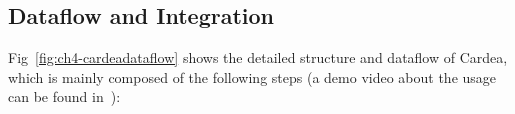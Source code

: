 \subsection{Dataflow and Integration}
Fig~\ref{fig:ch4-cardeadataflow} shows the detailed structure and dataflow of Cardea, which is mainly composed of the following steps (a demo video about the usage can be found in~\cite{links:cardeavid}):

\begin{description}[leftmargin=0cm]

\begin{figure}[!htbp]
\end{figure}
\end{description}

